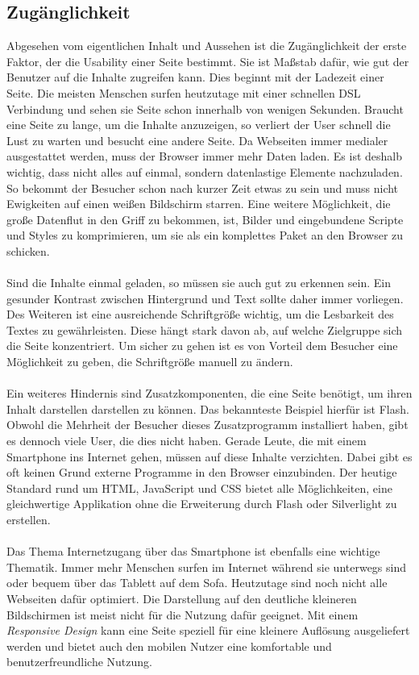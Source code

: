 \subsection{Zugänglichkeit}

Abgesehen vom eigentlichen Inhalt und Aussehen ist die Zugänglichkeit der erste Faktor, der die Usability einer Seite bestimmt. Sie ist Maßstab dafür, wie gut der Benutzer auf die Inhalte zugreifen kann. Dies beginnt mit der Ladezeit einer Seite. Die meisten Menschen surfen heutzutage mit einer schnellen DSL Verbindung und sehen sie Seite schon innerhalb von wenigen Sekunden. Braucht eine Seite zu lange, um die Inhalte anzuzeigen, so verliert der User schnell die Lust zu warten und besucht eine andere Seite. Da Webseiten immer medialer ausgestattet werden, muss der Browser immer mehr Daten laden. Es ist deshalb wichtig, dass nicht alles auf einmal, sondern datenlastige Elemente nachzuladen. So bekommt der Besucher schon nach kurzer Zeit etwas zu sein und muss nicht Ewigkeiten auf einen weißen Bildschirm starren. Eine weitere Möglichkeit, die große Datenflut in den Griff zu bekommen, ist, Bilder und eingebundene Scripte und Styles zu komprimieren, um sie als ein komplettes Paket an den Browser zu schicken.\\
\\
Sind die Inhalte einmal geladen, so müssen sie auch gut zu erkennen sein. Ein gesunder Kontrast zwischen Hintergrund und Text sollte daher immer vorliegen. Des Weiteren ist eine ausreichende Schriftgröße wichtig, um die Lesbarkeit des Textes zu gewährleisten. Diese hängt stark davon ab, auf welche Zielgruppe sich die Seite konzentriert. Um sicher zu gehen ist es von Vorteil dem Besucher eine Möglichkeit zu geben, die Schriftgröße manuell zu ändern.\\
\\
Ein weiteres Hindernis sind Zusatzkomponenten, die eine Seite benötigt, um ihren Inhalt darstellen darstellen zu können. Das bekannteste Beispiel hierfür ist Flash. Obwohl die Mehrheit der Besucher dieses Zusatzprogramm installiert haben, gibt es dennoch viele User, die dies nicht haben. Gerade Leute, die mit einem Smartphone ins Internet gehen, müssen auf diese Inhalte verzichten. Dabei gibt es oft keinen Grund externe Programme in den Browser einzubinden. Der heutige Standard rund um HTML, JavaScript und CSS bietet alle Möglichkeiten, eine gleichwertige Applikation ohne die Erweiterung durch Flash oder Silverlight zu erstellen.\\
\\
Das Thema Internetzugang über das Smartphone ist ebenfalls eine wichtige Thematik. Immer mehr Menschen surfen im Internet während sie unterwegs sind oder bequem über das Tablett auf dem Sofa. Heutzutage sind noch nicht alle Webseiten dafür optimiert. Die Darstellung auf den deutliche kleineren Bildschirmen ist meist nicht für die Nutzung dafür geeignet. Mit einem \textit{Responsive Design} kann eine Seite speziell für eine kleinere Auflösung ausgeliefert werden und bietet auch den mobilen Nutzer eine komfortable und benutzerfreundliche Nutzung.


